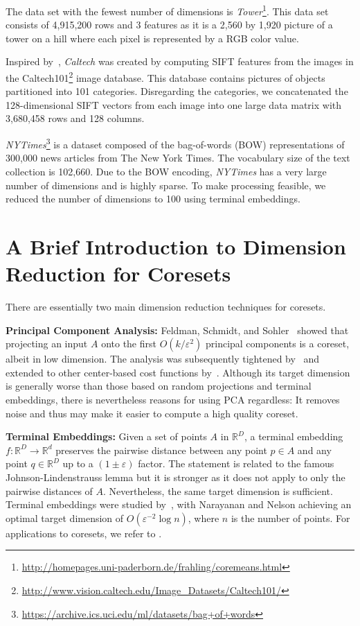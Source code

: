 The data set with the fewest number of dimensions is \textit{Tower}\footnote{\url{http://homepages.uni-paderborn.de/frahling/coremeans.html}}. This data set consists of 4,915,200 rows and 3 features as it is a 2,560 by 1,920 picture of a tower on a hill where each pixel is represented by a RGB color value. 

Inspired by~\cite{FGSSS13}, \textit{Caltech} was created by computing SIFT features from the images in the Caltech101\footnote{\url{http://www.vision.caltech.edu/Image_Datasets/Caltech101/}} image database. This database contains pictures of objects partitioned into 101 categories. Disregarding the categories, we concatenated the 128-dimensional SIFT vectors from each image into one large data matrix with 3,680,458 rows and 128 columns. 

\textit{NYTimes}\footnote{\url{https://archive.ics.uci.edu/ml/datasets/bag+of+words}} is a dataset composed of the bag-of-words (BOW) representations of 300,000 news articles from The New York Times. The vocabulary size of the text collection is 102,660. Due to the BOW encoding, \textit{NYTimes} has a very large number of dimensions and is highly sparse. To make processing feasible, we reduced the number of dimensions to 100 using terminal embeddings.





\section{A Brief Introduction to Dimension Reduction for Coresets}
There are essentially two main dimension reduction techniques for coresets.

{\bf Principal Component Analysis:} Feldman, Schmidt, and Sohler~\cite{FSS13} showed that projecting an input $A$ onto the first $O(k/\varepsilon^2)$ principal components is a coreset, albeit in low dimension. The analysis was subsequently tightened by~\cite{CEMMP15} and extended to other center-based cost functions by~\cite{SohlerW18}. Although its target dimension is generally worse than those based on random projections and terminal embeddings, there is nevertheless reasons for using PCA regardless: It removes noise and thus may make it easier to compute a high quality coreset.

{\bf Terminal Embeddings:} Given a set of points $A$ in $\mathbb{R}^D$, a terminal embedding $f:\mathbb{R}^D\rightarrow \mathbb{R}^d$ preserves the pairwise distance between any point $p\in A$ and any point $q\in \mathbb{R}^D$ up to a $(1\pm \varepsilon)$ factor. The statement is related to the famous Johnson-Lindenstrauss lemma but it is stronger as it does not apply to only the pairwise distances of $A$. Nevertheless, the same target dimension is sufficient. Terminal embeddings were studied by~\cite{ElkinFN17,MahabadiMMR18,NaN18}, with Narayanan and Nelson \cite{NaN18} achieving an optimal target dimension of $O(\varepsilon^{-2}\log n)$, where $n$ is the number of points. For applications to coresets, we refer to \cite{BecchettiBC0S19,Cohen-AddadSS21,huang2020coresets}.

